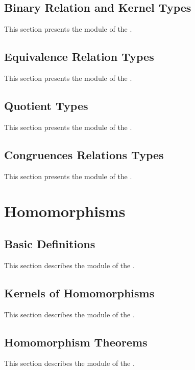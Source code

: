 \documentclass[a4paper,UKenglish,cleveref, autoref, thm-restate]{lipics-v2021}
\begin{document}
\subsection{Binary Relation and Kernel Types}\label{binary-relation-and-kernel-types}
This section presents the \ualibBinary module of the \agdaualib.


\subsection{Equivalence Relation Types}\label{sec:equiv-relat}
This section presents the \ualibEquivalences module of the \agdaualib.


\subsection{Quotient Types}\label{sec:quotient-types}
This section presents the \ualibQuotients module of the \agdaualib.


\subsection{Congruences Relations Types}\label{sec:congr-relat}
This section presents the \ualibCongruences module of the \agdaualib.


\newpage

\section{Homomorphisms}\label{sec:homomorphisms}

\subsection{Basic Definitions}
\label{sec:homs-basic-definitions}
This section describes the \ualibHomBasic module of the \agdaualib.


\subsection{Kernels of Homomorphisms}
\label{sec:kernels}
This section describes the \ualibKernels module of the \agdaualib.


\subsection{Homomorphism Theorems}
\label{sec:noether}
This section describes the \ualibNoether module of the \agdaualib.

\end{document}
